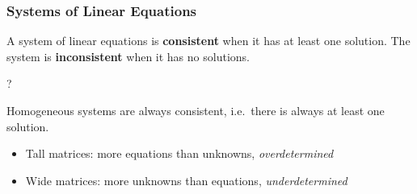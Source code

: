 \hypertarget{systems-of-linear-equations}{%
\subsubsection{Systems of Linear
Equations}\label{systems-of-linear-equations}}

\begin{definition}

A system of linear equations is \textbf{consistent} when it has at least
one solution. The system is \textbf{inconsistent} when it has no
solutions.

\end{definition}

\begin{definition}

?

\end{definition}

\begin{remark}

Homogeneous systems are always consistent, i.e.~there is always at least
one solution.

\end{remark}

\begin{remark}

\envlist

\begin{itemize}
\tightlist
\item
  Tall matrices: more equations than unknowns, \emph{overdetermined}
\item
  Wide matrices: more unknowns than equations, \emph{underdetermined}
\end{itemize}

\end{remark}

